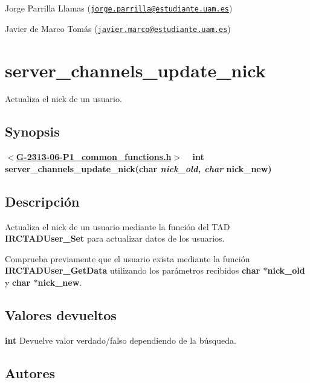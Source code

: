 \begin{DoxyItemize}
\item Jorge Parrilla Llamas (\href{mailto:jorge.parrilla@estudiante.uam.es}{\tt jorge.\+parrilla@estudiante.\+uam.\+es}) 
\item Javier de Marco Tomás (\href{mailto:javier.marco@estudiante.uam.es}{\tt javier.\+marco@estudiante.\+uam.\+es}) 
\end{DoxyItemize}\hypertarget{server_channels_update_nick}{}\section{server\+\_\+channels\+\_\+update\+\_\+nick}\label{server_channels_update_nick}
Actualiza el nick de un usuario.\hypertarget{server_channels_update_nick_synopsis_server_channels_update_nick}{}\subsection{Synopsis}\label{server_channels_update_nick_synopsis_server_channels_update_nick}
{ {\bfseries $<$\hyperlink{G-2313-06-P1__common__functions_8h}{G-\/2313-\/06-\/\+P1\+\_\+common\+\_\+functions.\+h}$>$} ~\newline
 {\bfseries int server\+\_\+channels\+\_\+update\+\_\+nick(char {\itshape nick\+\_\+old, char} nick\+\_\+new)} } \hypertarget{server_channels_update_nick_descripcion_server_channels_update_nick}{}\subsection{Descripción}\label{server_channels_update_nick_descripcion_server_channels_update_nick}
Actualiza el nick de un usuario mediante la función del T\+AD {\bfseries I\+R\+C\+T\+A\+D\+User\+\_\+\+Set} para actualizar datos de los usuarios. 

Comprueba previamente que el usuario exista mediante la función {\bfseries I\+R\+C\+T\+A\+D\+User\+\_\+\+Get\+Data} utilizando los parámetros recibidos {\bfseries char $\ast$nick\+\_\+old} y {\bfseries char $\ast$nick\+\_\+new}.\hypertarget{server_channels_update_nick_return_server_channels_update_nick}{}\subsection{Valores devueltos}\label{server_channels_update_nick_return_server_channels_update_nick}

\begin{DoxyItemize}
\item {\bfseries int} Devuelve valor verdado/falso dependiendo de la búsqueda. 
\end{DoxyItemize}\hypertarget{server_channels_update_nick_authors_server_channels_update_nick}{}\subsection{Autores}\label{server_channels_update_nick_authors_server_channels_update_nick}

